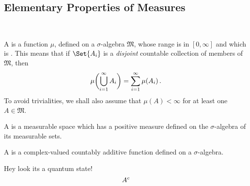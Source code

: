 \documentclass[12pt]{CrispyNotes}
\begin{document}
\subsection{Elementary Properties of Measures}
\begin{definition}~
    \begin{thmitems}
        \item
            A  is a function $\mu$, defined on a $\sigma$-algebra $\mathfrak{M}$, whose range is in $[0, \infty]$ and which is . This means that if $\Set{A_i}$ is a \emph{disjoint} countable collection of members of $\mathfrak{M}$, then
                \begin{equation}\label{d4}
                    \mu\biggl(\bigcup_{i=1}^\infty A_i\biggr) = \sum_{i=1}^\infty \mu(A_i)\mathclose{\,\text{.}}
                \end{equation}
            To avoid trivialities, we shall also assume that $\mu(A)<\infty$ for at least one $A\in\mathfrak{M}$.

        \item
            A  is a measurable space which has a positive measure defined on the $\sigma$-algebra of its measurable sets.

        \item
            A  is a complex-valued countably additive function defined on a $\sigma$-algebra.
  \end{thmitems}
\end{definition}

Hey look its a quantum state! 
    \begin{equation*}
      {A}^{c}
    \end{equation*}
    
\printbibliography
\end{document}
